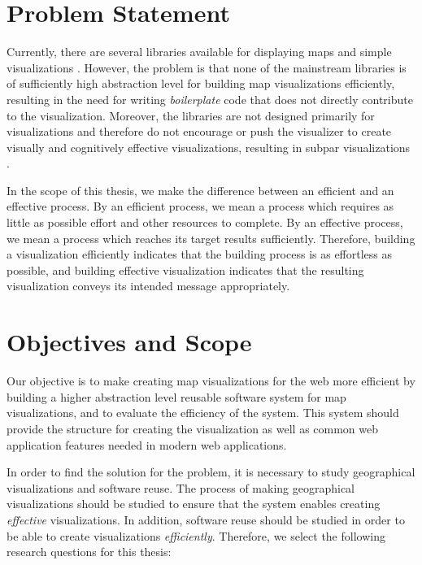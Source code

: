 \section{Problem Statement}

Currently, there are several libraries available for displaying maps and simple visualizations \citep{google_maps_2005,agafonkin_leaflet_2011,metacarta_openlayers_2006}. However, the problem is that none of the mainstream libraries is of sufficiently high abstraction level for building map visualizations efficiently, resulting in the need for writing \emph{boilerplate} code that does not directly contribute to the visualization. Moreover, the libraries are not designed primarily for visualizations and therefore do not encourage or push the visualizer to create visually and cognitively effective visualizations, resulting in subpar visualizations \citep[chap.~1]{slocum_thematic_2014}.

In the scope of this thesis, we make the difference between an efficient and an effective process. By an efficient process, we mean a process which requires as little as possible effort and other resources to complete. By an effective process, we mean a process which reaches its target results sufficiently. Therefore, building a visualization efficiently indicates that the building process is as effortless as possible, and building effective visualization indicates that the resulting visualization conveys its intended message appropriately. 

\section{Objectives and Scope}

Our objective is to make creating map visualizations for the web more efficient by building a higher abstraction level reusable software system for map visualizations, and to evaluate the efficiency of the system. This system should provide the structure for creating the visualization as well as common web application features needed in modern web applications.

In order to find the solution for the problem, it is necessary to study geographical visualizations and software reuse. The process of making geographical visualizations should be studied to ensure that the system enables creating \emph{effective} visualizations. In addition, software reuse should be studied in order to be able to create visualizations \emph{efficiently}. Therefore, we select the following research questions for this thesis:

